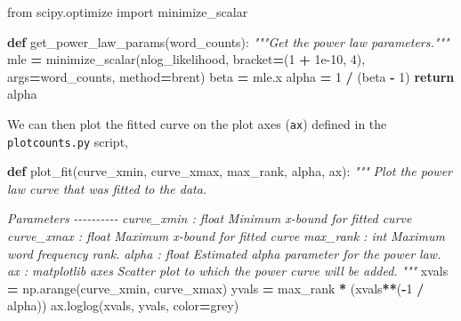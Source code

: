 \documentclass[
]{krantz}
\makeatletter
\newenvironment{Shaded}{\begin{snugshade}}{\end{snugshade}}
\newcommand{\CommentTok}[1]{\textcolor[rgb]{0.56,0.35,0.01}{\textit{#1}}}
\newcommand{\ControlFlowTok}[1]{\textcolor[rgb]{0.13,0.29,0.53}{\textbf{#1}}}
\newcommand{\DecValTok}[1]{\textcolor[rgb]{0.00,0.00,0.81}{#1}}
\newcommand{\FloatTok}[1]{\textcolor[rgb]{0.00,0.00,0.81}{#1}}
\newcommand{\ImportTok}[1]{#1}
\newcommand{\KeywordTok}[1]{\textcolor[rgb]{0.13,0.29,0.53}{\textbf{#1}}}
\newcommand{\NormalTok}[1]{#1}
\newcommand{\OperatorTok}[1]{\textcolor[rgb]{0.81,0.36,0.00}{\textbf{#1}}}
\newcommand{\StringTok}[1]{\textcolor[rgb]{0.31,0.60,0.02}{#1}}
\newenvironment{kframe}{%
\medskip{}
\setlength{\fboxsep}{.8em}
 \def\at@end@of@kframe{}%
 \ifinner\ifhmode%
  \def\at@end@of@kframe{\end{minipage}}%
  \begin{minipage}{\columnwidth}%
 \fi\fi%
 \def\FrameCommand##1{\hskip\@totalleftmargin \hskip-\fboxsep
 \colorbox{shadecolor}{##1}\hskip-\fboxsep
     \hskip-\linewidth \hskip-\@totalleftmargin \hskip\columnwidth}%
 \MakeFramed {\advance\hsize-\width
   \@totalleftmargin\z@ \linewidth\hsize
   \@setminipage}}%
 {\par\unskip\endMakeFramed%
 \at@end@of@kframe}
\renewenvironment{Shaded}{\begin{kframe}}{\end{kframe}}
\makeatother
\begin{document}
\begin{Shaded}
\begin{Highlighting}[]
\ImportTok{from}\NormalTok{ scipy.optimize }\ImportTok{import}\NormalTok{ minimize\_scalar}

\KeywordTok{def}\NormalTok{ get\_power\_law\_params(word\_counts):}
    \CommentTok{"""Get the power law parameters."""}
\NormalTok{    mle }\OperatorTok{=}\NormalTok{ minimize\_scalar(nlog\_likelihood, bracket}\OperatorTok{=}\NormalTok{(}\DecValTok{1} \OperatorTok{+} \FloatTok{1e{-}10}\NormalTok{, }\DecValTok{4}\NormalTok{),}
\NormalTok{                          args}\OperatorTok{=}\NormalTok{word\_counts, method}\OperatorTok{=}\StringTok{\textquotesingle{}brent\textquotesingle{}}\NormalTok{)}
\NormalTok{    beta }\OperatorTok{=}\NormalTok{ mle.x}
\NormalTok{    alpha }\OperatorTok{=} \DecValTok{1} \OperatorTok{/}\NormalTok{ (beta }\OperatorTok{{-}} \DecValTok{1}\NormalTok{)}
    \ControlFlowTok{return}\NormalTok{ alpha}
\end{Highlighting}
\end{Shaded}

We can then plot the fitted curve on the plot axes (\texttt{ax})
defined in the \texttt{plotcounts.py} script,

\begin{Shaded}
\begin{Highlighting}[]
\KeywordTok{def}\NormalTok{ plot\_fit(curve\_xmin, curve\_xmax, max\_rank, alpha, ax):}
    \CommentTok{"""}
\CommentTok{    Plot the power law curve that was fitted to the data.}

\CommentTok{    Parameters}
\CommentTok{    {-}{-}{-}{-}{-}{-}{-}{-}{-}{-}}
\CommentTok{    curve\_xmin : float}
\CommentTok{        Minimum x{-}bound for fitted curve}
\CommentTok{    curve\_xmax : float}
\CommentTok{        Maximum x{-}bound for fitted curve}
\CommentTok{    max\_rank : int}
\CommentTok{        Maximum word frequency rank.}
\CommentTok{    alpha : float}
\CommentTok{        Estimated alpha parameter for the power law.}
\CommentTok{    ax : matplotlib axes}
\CommentTok{        Scatter plot to which the power curve will be added.}
\CommentTok{    """}
\NormalTok{    xvals }\OperatorTok{=}\NormalTok{ np.arange(curve\_xmin, curve\_xmax)}
\NormalTok{    yvals }\OperatorTok{=}\NormalTok{ max\_rank }\OperatorTok{*}\NormalTok{ (xvals}\OperatorTok{**}\NormalTok{(}\OperatorTok{{-}}\DecValTok{1} \OperatorTok{/}\NormalTok{ alpha))}
\NormalTok{    ax.loglog(xvals, yvals, color}\OperatorTok{=}\StringTok{\textquotesingle{}grey\textquotesingle{}}\NormalTok{)}
\end{Highlighting}
\end{Shaded}
\end{document}
